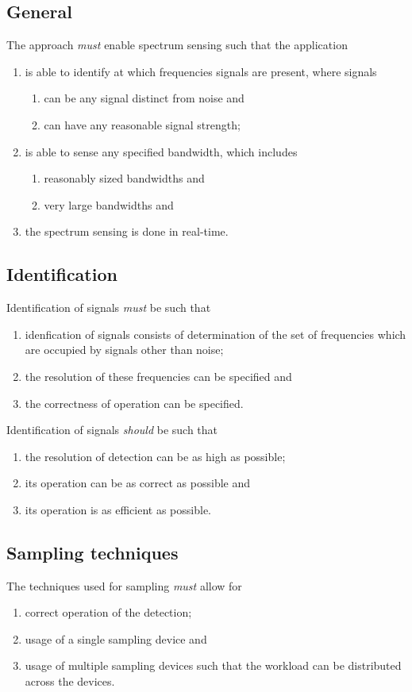 \documentclass[a4paper, openany, oneside]{memoir}
\begin{document}
\subsection{General}
The approach \emph{must} enable spectrum sensing such that the application
\begin{enumerate}
    \item is able to identify at which frequencies signals are present, where signals
    \begin{enumerate}
        \item can be any signal distinct from noise and
        \item can have any reasonable signal strength;
    \end{enumerate}
    \item is able to sense any specified bandwidth, which includes
    \begin{enumerate}
        \item reasonably sized bandwidths and
        \item very large bandwidths and
    \end{enumerate}
    \item the spectrum sensing is done in real-time.
\end{enumerate}

\subsection{Identification}
Identification of signals \emph{must} be such that
\begin{enumerate}
    \item idenfication of signals consists of determination of the set of frequencies which are occupied by signals other than noise;
    \item the resolution of these frequencies can be specified and
    \item the correctness of operation can be specified.
\end{enumerate}
Identification of signals \emph{should} be such that
\begin{enumerate}
    \item the resolution of detection can be as high as possible;
    \item its operation can be as correct as possible and
    \item its operation is as efficient as possible.
\end{enumerate}

\subsection{Sampling techniques}
The techniques used for sampling \emph{must} allow for
\begin{enumerate}
    \item correct operation of the detection;
    \item usage of a single sampling device and
    \item usage of multiple sampling devices such that the workload can be distributed across the devices.
\end{enumerate}
\end{document}
